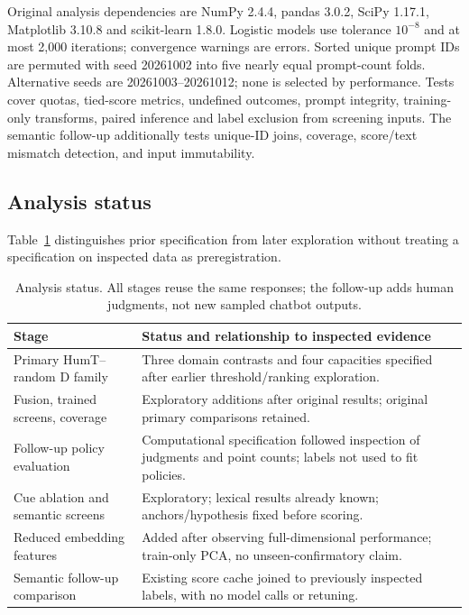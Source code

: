Original analysis dependencies are NumPy 2.4.4, pandas 3.0.2, SciPy 1.17.1, Matplotlib 3.10.8 and scikit-learn 1.8.0. Logistic models use tolerance $10^{-8}$ and at most 2,000 iterations; convergence warnings are errors. Sorted unique prompt IDs are permuted with seed 20261002 into five nearly equal prompt-count folds. Alternative seeds are 20261003--20261012; none is selected by performance. Tests cover quotas, tied-score metrics, undefined outcomes, prompt integrity, training-only transforms, paired inference and label exclusion from screening inputs. The semantic follow-up additionally tests unique-ID joins, coverage, score/text mismatch detection, and input immutability.

\subsection{Analysis status}\label{app:stages}
Table~\ref{tab:analysis_status} distinguishes prior specification from later exploration without treating a specification on inspected data as preregistration.
\begin{table}[htbp]
\centering\small
\caption{Analysis status. All stages reuse the same responses; the follow-up adds human judgments, not new sampled chatbot outputs.}
\label{tab:analysis_status}
\begin{tabularx}{\linewidth}{lX}
\toprule
Stage & Status and relationship to inspected evidence \\
\midrule
Primary HumT--random D family & Three domain contrasts and four capacities specified after earlier threshold/ranking exploration. \\
Fusion, trained screens, coverage & Exploratory additions after original results; original primary comparisons retained. \\
Follow-up policy evaluation & Computational specification followed inspection of judgments and point counts; labels not used to fit policies. \\
Cue ablation and semantic screens & Exploratory; lexical results already known; anchors/hypothesis fixed before scoring. \\
Reduced embedding features & Added after observing full-dimensional performance; train-only PCA, no unseen-confirmatory claim. \\
Semantic follow-up comparison & Existing score cache joined to previously inspected labels, with no model calls or retuning. \\
\bottomrule
\end{tabularx}
\end{table}

